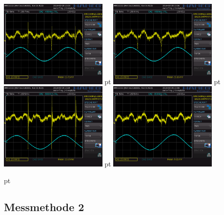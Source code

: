 \documentclass[12pt]{article}
\begin{document}
\begin{minipage}[h!]{\textwidth}
	\centering
	\includegraphics[width=0.4\textwidth]{data/HHH01.PNG} pt
	\includegraphics[width=0.4\textwidth]{data/HHH02.PNG} pt
	\includegraphics[width=0.4\textwidth]{data/HHH03.PNG} pt
	\includegraphics[width=0.4\textwidth]{data/HHH04.PNG}
\end{minipage}
 pt

\subsection{Messmethode 2} \label{FUCKTHISSHIT}
\end{document}

